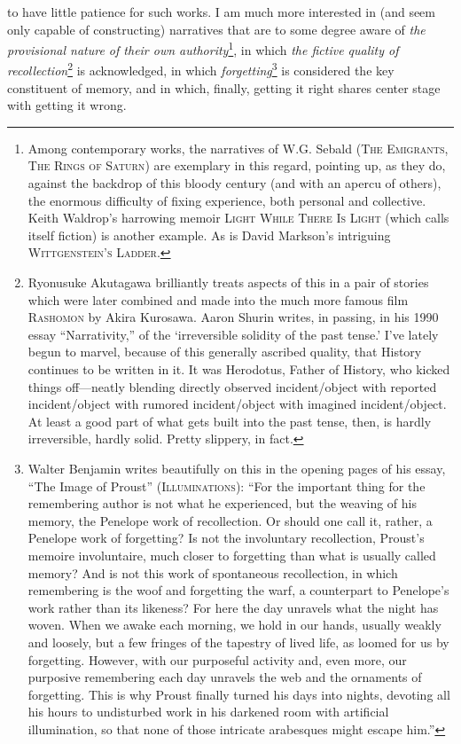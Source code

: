 \documentclass[
]{memoir}
\newlength{\drop}%
\begin{document}
to have little patience for such works. I am much more interested in
(and seem only capable of constructing) narratives that are to some
degree aware of \emph{the provisional nature of their own
authority}\footnote{Among contemporary works, the narratives of W.G.
  Sebald (\textsc{The Emigrants, The Rings of Saturn}) are exemplary in
  this regard, pointing up, as they do, against the backdrop of this
  bloody century (and with an apercu of others), the enormous difficulty
  of fixing experience, both personal and collective. Keith Waldrop's
  harrowing memoir \textsc{Light While There Is Light} (which calls
  itself fiction) is another example. As is David Markson's intriguing
  \textsc{Wittgenstein's Ladder}.}, in which \emph{the fictive quality
of recollection}\footnote{Ryonusuke Akutagawa brilliantly treats aspects
  of this in a pair of stories which were later combined and made into
  the much more famous film \textsc{Rashomon} by Akira Kurosawa. Aaron
  Shurin writes, in passing, in his 1990 essay ``Narrativity,'' of the
  `irreversible solidity of the past tense.' I've lately begun to
  marvel, because of this generally ascribed quality, that History
  continues to be written in it. It was Herodotus, Father of History,
  who kicked things off---neatly blending directly observed
  incident/object with reported incident/object with rumored
  incident/object with imagined incident/object. At least a good part of
  what gets built into the past tense, then, is hardly irreversible,
  hardly solid. Pretty slippery, in fact.} is acknowledged, in which
\emph{forgetting}\footnote{Walter Benjamin writes beautifully on this in
  the opening pages of his essay, ``The Image of Proust''
  (\textsc{Illuminations}): ``For the important thing for the
  remembering author is not what he experienced, but the weaving of his
  memory, the Penelope work of recollection. Or should one call it,
  rather, a Penelope work of forgetting? Is not the involuntary
  recollection, Proust's memoire involuntaire, much closer to forgetting
  than what is usually called memory? And is not this work of
  spontaneous recollection, in which remembering is the woof and
  forgetting the warf, a counterpart to Penelope's work rather than its
  likeness? For here the day unravels what the night has woven. When we
  awake each morning, we hold in our hands, usually weakly and loosely,
  but a few fringes of the tapestry of lived life, as loomed for us by
  forgetting. However, with our purposeful activity and, even more, our
  purposive remembering each day unravels the web and the ornaments of
  forgetting. This is why Proust finally turned his days into nights,
  devoting all his hours to undisturbed work in his darkened room with
  artificial illumination, so that none of those intricate arabesques
  might escape him.''} is considered the key constituent of memory, and
in which, finally, getting it right shares center stage with getting it
wrong.
\end{document}
